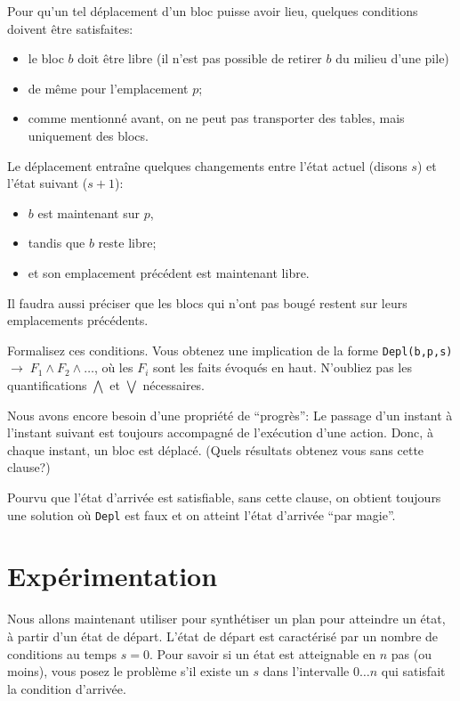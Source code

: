 Pour qu'un tel déplacement d'un bloc puisse avoir lieu, quelques conditions
doivent être satisfaites:

\begin{itemize}
\item le bloc $b$ doit être libre (il n'est pas possible de retirer $b$ du
  milieu d'une pile)
\item de même pour l'emplacement $p$;
\item comme mentionné avant, on ne peut pas transporter des tables, mais
  uniquement des blocs.
\end{itemize}

Le déplacement entraîne quelques changements entre l'état actuel (disons $s$)
et l'état suivant ($s + 1$):
\begin{itemize}
\item $b$ est maintenant sur $p$,
\item tandis que $b$ reste libre;
\item et son emplacement précédent est maintenant libre.
\end{itemize}

Il faudra aussi préciser que les blocs qui n'ont pas bougé restent sur leurs
emplacements précédents.

\begin{exo}\label{ex:depl}
Formalisez ces conditions. Vous obtenez une implication de la forme
  \texttt{Depl(b,p,s) $\to \; F_1 \land F_2 \land \dots$}, où les $F_i$
  sont les faits évoqués en haut.  N'oubliez pas les quantifications
  $\bigwedge$ et $\bigvee$ nécessaires.
\end{exo}

\begin{exo}\label{ex:progr}
Nous avons encore besoin d'une propriété de \enquote{progrès}: Le passage d'un
  instant à l'instant suivant est toujours accompagné de l'exécution d'une
  action. Donc, à chaque instant, un bloc est déplacé.
  (Quels résultats obtenez vous sans cette clause?)
\end{exo}

  Pourvu que l'état d'arrivée est satisfiable, sans cette clause, on obtient
  toujours une solution où \texttt{Depl} est faux et on atteint l'état
  d'arrivée \enquote{par magie}.

\section{Expérimentation}\label{sec:exper}

Nous allons maintenant utiliser \textsc{\touist} pour synthétiser un plan
pour atteindre un état, à partir d'un état de départ. L'état de départ est
caractérisé par un nombre de conditions au temps $s = 0$. Pour savoir si un
état est atteignable en $n$ pas (ou moins), vous posez le problème s'il existe
un $s$ dans l'intervalle $0 \dots n$ qui satisfait la condition d'arrivée. 

